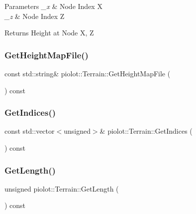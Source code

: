 \begin{DoxyParams}{Parameters}
{\em \+\_\+x} & Node Index X \\
\hline
{\em \+\_\+z} & Node Index Z \\
\hline
\end{DoxyParams}
\begin{DoxyReturn}{Returns}
Height at Node X, Z 
\end{DoxyReturn}
\mbox{\label{classpiolot_1_1_terrain_a8ce0f148b1b05889f609796d09840543}} 
\subsubsection{\texorpdfstring{Get\+Height\+Map\+File()}{GetHeightMapFile()}}
{\footnotesize\ttfamily const std\+::string\& piolot\+::\+Terrain\+::\+Get\+Height\+Map\+File (\begin{DoxyParamCaption}{ }\end{DoxyParamCaption}) const\hspace{0.3cm}{\ttfamily [inline]}}

\mbox{\label{classpiolot_1_1_terrain_ada8caf451e4946153d9a0cc4d5d0fcaf}} 
\subsubsection{\texorpdfstring{Get\+Indices()}{GetIndices()}}
{\footnotesize\ttfamily const std\+::vector$<$unsigned$>$\& piolot\+::\+Terrain\+::\+Get\+Indices (\begin{DoxyParamCaption}{ }\end{DoxyParamCaption}) const\hspace{0.3cm}{\ttfamily [inline]}}

\mbox{\label{classpiolot_1_1_terrain_aeb2f5954d70bc27d7dc84ab15180c502}} 
\subsubsection{\texorpdfstring{Get\+Length()}{GetLength()}}
{\footnotesize\ttfamily unsigned piolot\+::\+Terrain\+::\+Get\+Length (\begin{DoxyParamCaption}{ }\end{DoxyParamCaption}) const\hspace{0.3cm}{\ttfamily [inline]}}

